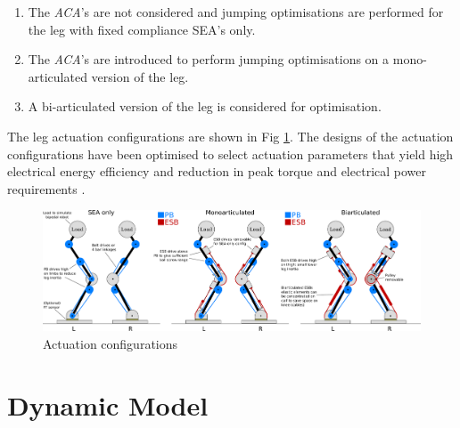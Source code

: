 \documentclass[letterpaper, 10 pt, conference]{ieeeconf}  %
\begin{document}
  \begin{enumerate}
	\item The \textit{ACA}'s are not considered and jumping optimisations are performed for the leg with fixed compliance SEA's only.
	\item The \textit{ACA}'s are introduced to perform jumping optimisations on a mono-articulated version of the leg. 
	\item A bi-articulated version of the leg is considered for optimisation.
\end{enumerate}
The leg actuation configurations are shown in Fig \ref{fig:configurations}. The designs of the actuation configurations have been optimised to select actuation
parameters that yield high electrical energy efficiency and reduction in peak torque and electrical power requirements \cite{roozing2016design}.



\begin{figure}[ht]
	\centering
	\includegraphics[width=\linewidth]{3-DoF_leg_concept}
	\caption{Actuation configurations}
	\label{fig:configurations}
\end{figure}

\section{Dynamic Model} \label{sec:dynamicModel}
\end{document}
